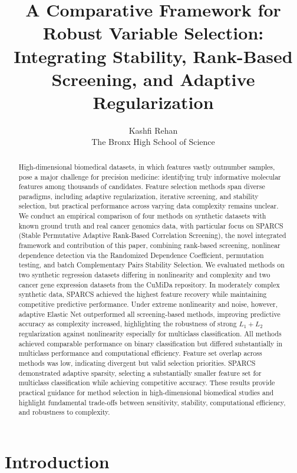 \documentclass[11pt]{article}
\title{\vspace{-2em}A Comparative Framework for Robust Variable Selection:\\
Integrating Stability, Rank-Based Screening, and Adaptive Regularization}
\author{Kashfi Rehan\\\small The Bronx High School of Science}
\date{}
\begin{document}
\maketitle

\begin{abstract}
\noindent High-dimensional biomedical datasets, in which features vastly outnumber samples, pose a
major challenge for precision medicine: identifying truly informative molecular features among
thousands of candidates. Feature selection methods span diverse paradigms, including adaptive
regularization, iterative screening, and stability selection, but practical performance across
varying data complexity remains unclear. We conduct an empirical comparison of four methods on
synthetic datasets with known ground truth and real cancer genomics data, with particular focus on
SPARCS (Stable Permutative Adaptive Rank-Based Correlation Screening), the novel integrated
framework and contribution of this paper, combining rank-based screening, nonlinear dependence
detection via the Randomized Dependence Coefficient, permutation testing, and batch Complementary
Pairs Stability Selection. We evaluated methods on two synthetic regression datasets differing in
nonlinearity and complexity and two cancer gene expression datasets from the CuMiDa repository. In
moderately complex synthetic data, SPARCS achieved the highest feature recovery while maintaining
competitive predictive performance. Under extreme nonlinearity and noise, however, adaptive Elastic
Net outperformed all screening-based methods, improving predictive accuracy as complexity increased,
highlighting the robustness of strong $L_1+L_2$ regularization against nonlinearity especially for
multiclass classification. All methods achieved comparable performance on binary classification but
differed substantially in multiclass performance and computational efficiency. Feature set overlap
across methods was low, indicating divergent but valid selection priorities. SPARCS demonstrated
adaptive sparsity, selecting a substantially smaller feature set for multiclass classification while
achieving competitive accuracy. These results provide practical guidance for method selection in
high-dimensional biomedical studies and highlight fundamental trade-offs between sensitivity,
stability, computational efficiency, and robustness to complexity.
\end{abstract}

\section{Introduction}
\end{document}
